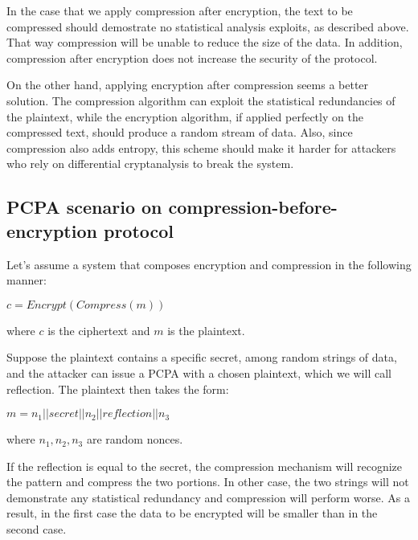 In the case that we apply compression after encryption, the text to be
compressed should demostrate no statistical analysis exploits, as described
above. That way compression will be unable to reduce the size of the data. In
addition, compression after encryption does not increase the security of the
protocol.

On the other hand, applying encryption after compression seems a better
solution. The compression algorithm can exploit the statistical redundancies of
the plaintext, while the encryption algorithm, if applied perfectly on the
compressed text, should produce a random stream of data. Also, since compression
also adds entropy, this scheme should make it harder for attackers who rely on
differential cryptanalysis to break the system.

\subsection{PCPA scenario on compression-before-encryption protocol}

Let's assume a system that composes encryption and compression in the following
manner:

\begin{math}c = Encrypt(Compress(m))\end{math}

where \begin{math}c\end{math} is the ciphertext and \begin{math}m\end{math} is
the plaintext.

Suppose the plaintext contains a specific secret, among random strings of data,
and the attacker can issue a PCPA with a chosen plaintext, which we will call
reflection. The plaintext then takes the form:

\begin{math}m = n_1 || secret || n_2 || reflection || n_3\end{math}

where \begin{math}n_1, n_2, n_3\end{math} are random nonces.

If the reflection is equal to the secret, the compression mechanism will
recognize the pattern and compress the two portions. In other case, the two
strings will not demonstrate any statistical redundancy and compression will
perform worse. As a result, in the first case the data to be encrypted will be
smaller than in the second case.

